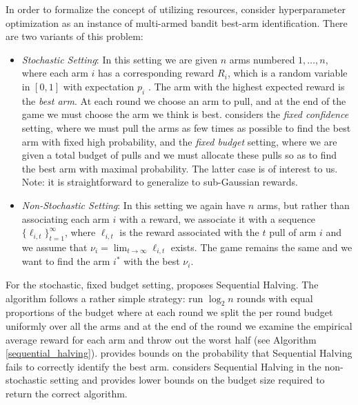 \documentclass[11pt]{article}
\begin{document}
In order to formalize the concept of utilizing resources, \cite{Jamieson2015} consider hyperparameter optimization as an instance of multi-armed bandit best-arm identification. There are two variants of this problem:
\begin{itemize}
\item {\it Stochastic Setting}: In this setting we are given $n$ arms numbered $1,\ldots,n$, where each arm $i$ has a corresponding reward $R_i$, which is a random variable in $[0,1]$ with expectation $p_i$ \cite{Karnin2013, Even-dar2003}. The arm with the highest expected reward is the {\it best arm}. At each round we choose an arm to pull, and at the end of the game we must choose the arm we think is best. \cite{Karnin2013} considers the {\it fixed confidence} setting, where we must pull the arms as few times as possible to find the best arm with fixed high probability, and the {\it fixed budget} setting, where we are given a total budget of pulls and we must allocate these pulls so as to find the best arm with maximal probability. The latter case is of interest to us. Note: it is straightforward to generalize to sub-Gaussian rewards.
\item {\it Non-Stochastic Setting}: In this setting we again have $n$ arms, but rather than associating each arm $i$ with a reward, we associate it with a sequence $\{\ell_{i,t}\}_{t=1}^\infty$, where $\ell_{i,t}$ is the reward associated with the $t$ pull of arm $i$ and we assume that $\nu_i = \lim_{t \to \infty} \ell_{i,t}$ exists. The game remains the same and we want to find the arm $i^*$ with the best $\nu_i$.
\end{itemize}
For the stochastic, fixed budget setting, \cite{Karnin2013} proposes Sequential Halving. The algorithm follows a rather simple strategy: run $\log_2 n$ rounds with equal proportions of the budget where at each round we split the per round budget uniformly over all the arms and at the end of the round we examine the empirical average reward for each arm and throw out the worst half (see Algorithm \ref{sequential_halving}). \cite{Karnin2013} provides bounds on the probability that Sequential Halving fails to correctly identify the best arm. \cite{Jamieson2015} considers Sequential Halving in the non-stochastic setting and provides lower bounds on the budget size required to return the correct algorithm.
\end{document}
